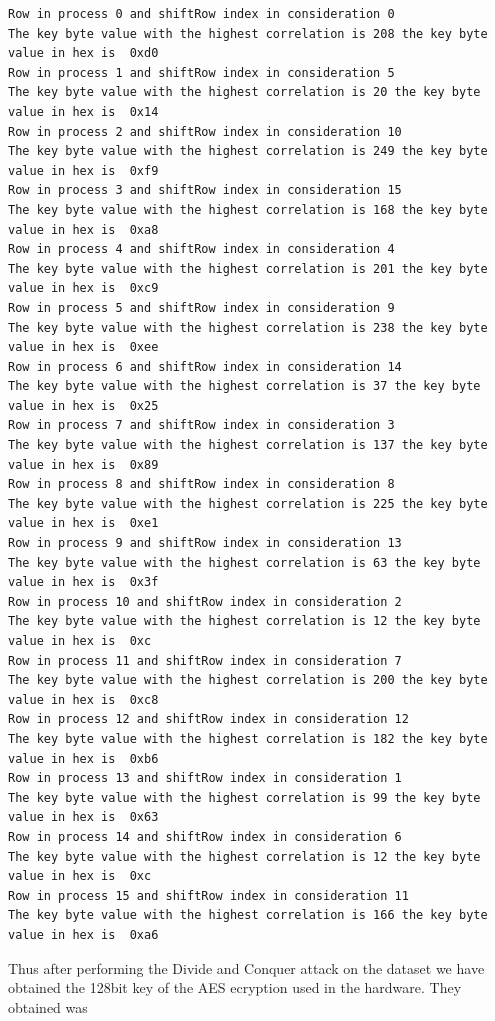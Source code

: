 \documentclass[12pt, letterpaper, oneside]{report}
\begin{document}
\begin{lstlisting}
Row in process 0 and shiftRow index in consideration 0
The key byte value with the highest correlation is 208 the key byte value in hex is  0xd0
Row in process 1 and shiftRow index in consideration 5
The key byte value with the highest correlation is 20 the key byte value in hex is  0x14
Row in process 2 and shiftRow index in consideration 10
The key byte value with the highest correlation is 249 the key byte value in hex is  0xf9
Row in process 3 and shiftRow index in consideration 15
The key byte value with the highest correlation is 168 the key byte value in hex is  0xa8
Row in process 4 and shiftRow index in consideration 4
The key byte value with the highest correlation is 201 the key byte value in hex is  0xc9
Row in process 5 and shiftRow index in consideration 9
The key byte value with the highest correlation is 238 the key byte value in hex is  0xee
Row in process 6 and shiftRow index in consideration 14
The key byte value with the highest correlation is 37 the key byte value in hex is  0x25
Row in process 7 and shiftRow index in consideration 3
The key byte value with the highest correlation is 137 the key byte value in hex is  0x89
Row in process 8 and shiftRow index in consideration 8
The key byte value with the highest correlation is 225 the key byte value in hex is  0xe1
Row in process 9 and shiftRow index in consideration 13
The key byte value with the highest correlation is 63 the key byte value in hex is  0x3f
Row in process 10 and shiftRow index in consideration 2
The key byte value with the highest correlation is 12 the key byte value in hex is  0xc
Row in process 11 and shiftRow index in consideration 7
The key byte value with the highest correlation is 200 the key byte value in hex is  0xc8
Row in process 12 and shiftRow index in consideration 12
The key byte value with the highest correlation is 182 the key byte value in hex is  0xb6
Row in process 13 and shiftRow index in consideration 1
The key byte value with the highest correlation is 99 the key byte value in hex is  0x63
Row in process 14 and shiftRow index in consideration 6
The key byte value with the highest correlation is 12 the key byte value in hex is  0xc
Row in process 15 and shiftRow index in consideration 11
The key byte value with the highest correlation is 166 the key byte value in hex is  0xa6    
\end{lstlisting}

Thus after performing the Divide and Conquer attack on the dataset we have obtained the 128bit key of the AES ecryption used in the hardware. They obtained was
\end{document}
